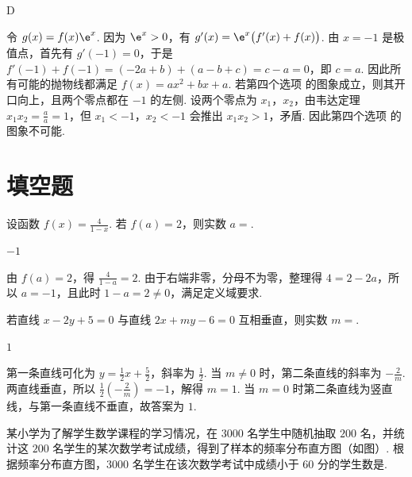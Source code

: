 \begin{answer}
D
\end{answer}

\begin{solution}
令 \(g(x)=f(x)\e^x\). 因为 \(\e^x>0\)，有 \(g'(x)=\e^x\bigl(f'(x)+f(x)\bigr)\). 由 \(x=-1\) 是极值点，首先有 \(g'(-1)=0\)，于是 \(f'(-1)+f(-1)=(-2a+b)+(a-b+c)=c-a=0\)，即 \(c=a\). 因此所有可能的抛物线都满足 \(f(x)=ax^2+bx+a\). 若第四个选项 的图象成立，则其开口向上，且两个零点都在 \(-1\) 的左侧. 设两个零点为 \(x_1\)，\(x_2\)，由韦达定理 \(x_1x_2=\frac{a}{a}=1\)，但 \(x_1<-1\)，\(x_2<-1\) 会推出 \(x_1x_2>1\)，矛盾. 因此第四个选项 的图象不可能.
\end{solution}

\section{填空题}

\begin{problem}
设函数 \( f(x) = \frac{4}{1 - x} \). 若 \( f(a) = 2 \)，则实数 \( a = \)\fillinblank{}.
\end{problem}

\begin{answer}
\(-1\)
\end{answer}

\begin{solution}
由 \(f(a)=2\)，得 \(\frac4{1-a}=2\). 由于右端非零，分母不为零，整理得 \(4=2-2a\)，所以 \(a=-1\)，且此时 \(1-a=2\neq0\)，满足定义域要求.
\end{solution}

\begin{problem}
若直线 \(x - 2y + 5 = 0\) 与直线 \(2x + my - 6 = 0\) 互相垂直，则实数 \(m = \)\fillinblank{}.
\end{problem}

\begin{answer}
\(1\)
\end{answer}

\begin{solution}
第一条直线可化为 \(y=\frac12x+\frac52\)，斜率为 \(\frac12\). 当 \(m\neq0\) 时，第二条直线的斜率为 \(-\frac2m\). 两直线垂直，所以 \(\frac12\left(-\frac2m\right)=-1\)，解得 \(m=1\). 当 \(m=0\) 时第二条直线为竖直线，与第一条直线不垂直，故答案为 \(1\).
\end{solution}

\begin{problem}
某小学为了解学生数学课程的学习情况，在 \(3000\) 名学生中随机抽取 \(200\) 名，并统计这 \(200\) 名学生的某次数学考试成绩，得到了样本的频率分布直方图（如图）. 根据频率分布直方图，\(3000\) 名学生在该次数学考试中成绩小于 \(60\) 分的学生数是\fillinblank{}.
\end{problem}

